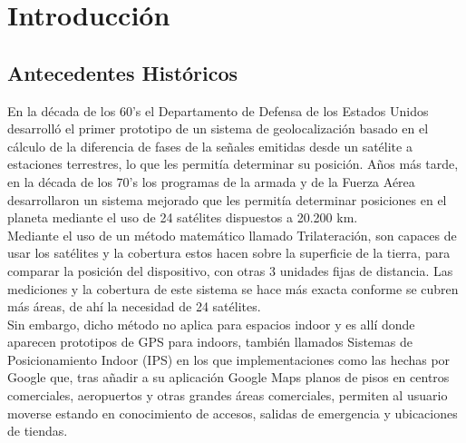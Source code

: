 \chapter{Introducción}

\section{Antecedentes Históricos}

En la década de los 60's el Departamento de Defensa de los Estados Unidos desarrolló el primer prototipo de un sistema de geolocalización basado en el cálculo de la diferencia de fases de la señales emitidas desde un satélite a estaciones terrestres, lo que les permitía determinar su posición. Años más tarde, en la década de los 70's los programas de la armada y de la Fuerza Aérea desarrollaron un sistema mejorado que les permitía determinar posiciones en el planeta mediante el uso de 24 satélites dispuestos a 20.200 km.\\

Mediante el uso de un método matemático llamado Trilateración, son capaces de usar los satélites y la cobertura estos hacen sobre la superficie de la tierra, para comparar la posición del dispositivo, con otras 3 unidades fijas de distancia. Las mediciones y la cobertura de este sistema se hace más exacta conforme se cubren más áreas, de ahí la necesidad de 24 satélites.\\

Sin embargo, dicho método no aplica para espacios indoor y es allí donde aparecen prototipos de GPS para indoors, también llamados Sistemas de Posicionamiento Indoor (\ac{IPS}) en los que implementaciones como las hechas por Google que, tras añadir a su aplicación Google Maps planos de pisos en centros comerciales, aeropuertos y otras grandes áreas comerciales, permiten al usuario moverse estando en conocimiento de accesos, salidas de emergencia y ubicaciones de tiendas. 


